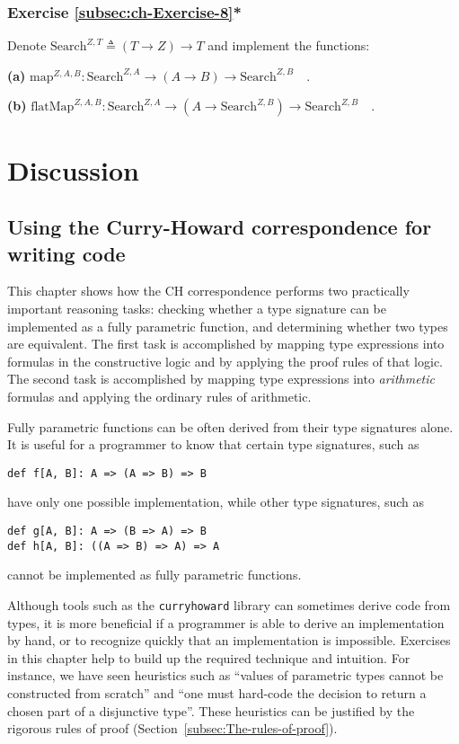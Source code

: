 \subsubsection{Exercise \label{subsec:ch-Exercise-8}\ref{subsec:ch-Exercise-8}{*}}

Denote $\text{Search}^{Z,T}\triangleq\left(T\rightarrow Z\right)\rightarrow T$
and implement the functions:

\textbf{(a)} $\text{map}^{Z,A,B}:\text{Search}^{Z,A}\rightarrow\left(A\rightarrow B\right)\rightarrow\text{Search}^{Z,B}\quad.$

\textbf{(b)} $\text{flatMap}^{Z,A,B}:\text{Search}^{Z,A}\rightarrow(A\rightarrow\text{Search}^{Z,B})\rightarrow\text{Search}^{Z,B}\quad.$

\section{Discussion}

\subsection{Using the Curry-Howard correspondence for writing code}

This chapter shows how the CH correspondence performs two practically
important reasoning tasks: checking whether a type signature can be
implemented as a fully parametric function, and determining whether
two types are equivalent. The first task is accomplished by mapping
type expressions into formulas in the constructive logic and by applying
the proof rules of that logic. The second task is accomplished by
mapping type expressions into \emph{arithmetic} formulas and applying
the ordinary rules of arithmetic.

Fully parametric functions can be often derived from their type signatures
alone. It is useful for a programmer to know that certain type signatures,
such as
\begin{lstlisting}
def f[A, B]: A => (A => B) => B
\end{lstlisting}
have only one possible implementation, while other type signatures,
such as
\begin{lstlisting}
def g[A, B]: A => (B => A) => B
def h[A, B]: ((A => B) => A) => A
\end{lstlisting}
cannot be implemented as fully parametric functions.

Although tools such as the \texttt{curryhoward} library can sometimes
derive code from types, it is more beneficial if a programmer is able
to derive an implementation by hand, or to recognize quickly that
an implementation is impossible. Exercises in this chapter help to
build up the required technique and intuition. For instance, we have
seen heuristics such as \textsf{``}values of parametric types cannot be constructed
from scratch\textsf{''} and \textsf{``}one must hard-code the decision to return a
chosen part of a disjunctive type\textsf{''}. These heuristics can be justified
by the rigorous rules of proof (Section~\ref{subsec:The-rules-of-proof}). 

